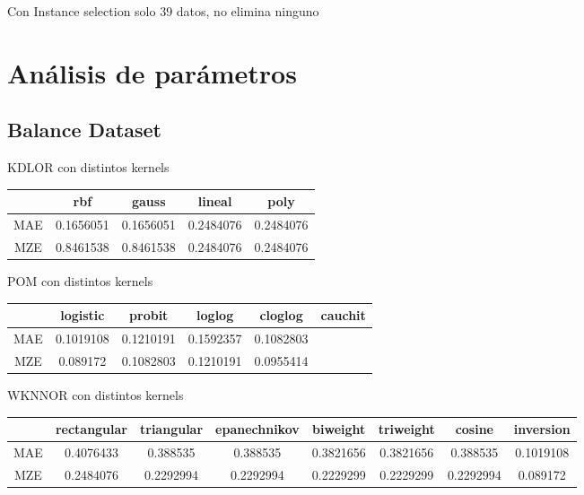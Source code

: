 Con Instance selection solo 39 datos, no elimina ninguno


\section{Análisis de parámetros}
\subsection{Balance Dataset}

KDLOR con distintos kernels \\

\begin{tabular}{ c c c c c  }
	& rbf & gauss & lineal & poly \\
	\hline	
	MAE &   0.1656051  & 0.1656051 & 0.2484076  &  0.2484076 \\
	MZE &	0.8461538 & 0.8461538 & 0.2484076 & 0.2484076 \\
	\hline  
\end{tabular}



POM con distintos kernels \\

\begin{tabular}{ c c c c c c }
	& logistic & probit & loglog & cloglog & cauchit \\
	\hline	
	MAE &   0.1019108  & 0.1210191 & 0.1592357  &  0.1082803 & \\
	MZE &	0.089172 & 0.1082803 & 0.1210191 & 0.0955414 &  \\
	\hline  
\end{tabular}


WKNNOR con distintos kernels \\

\begin{tabular}{ c c c c c c c c }

	& rectangular & triangular & epanechnikov & biweight & triweight & cosine & inversion \\
	\hline	
	MAE &   0.4076433  & 0.388535 & 0.388535  &  0.3821656 & 0.3821656 & 0.388535 & 0.1019108 \\
	MZE &	0.2484076 & 0.2292994 & 0.2292994 & 0.2229299 & 0.2229299 & 0.2292994 & 0.089172  \\
	\hline  
\end{tabular}


